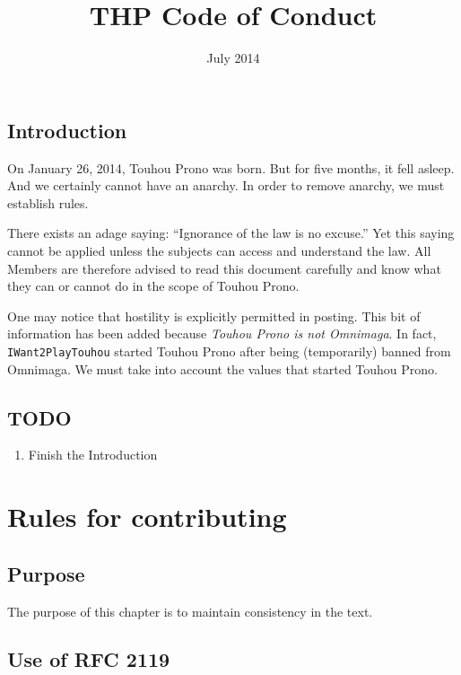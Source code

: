 \documentclass[10pt]{book}
\title{THP Code of Conduct}
\date{July 2014}
\begin{document}
\maketitle

\tableofcontents

\section{Introduction}

On January 26, 2014, Touhou Prono was born. But for five months, it fell asleep. And we certainly cannot have an anarchy. In order to remove anarchy, we must establish rules.

There exists an adage saying: ``Ignorance of the law is no excuse.'' Yet this saying cannot be applied unless the subjects can access and understand the law. All Members are therefore advised to read this document carefully and know what they can or cannot do in the scope of Touhou Prono.

One may notice that hostility is explicitly permitted in posting. This bit of information has been added because \emph{Touhou Prono is not Omnimaga}. In fact, \texttt{IWant2PlayTouhou} started Touhou Prono after being (temporarily) banned from Omnimaga. We must take into account the values that started Touhou Prono.

\section{TODO}

\begin{enumerate}
 \item Finish the Introduction
\end{enumerate}

\chapter{Rules for contributing}

\section{Purpose}

The purpose of this chapter is to maintain consistency in the text.

\section{Use of RFC 2119}
\end{document}
